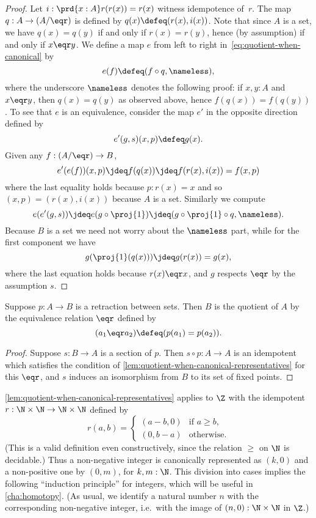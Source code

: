 \begin{proof}
  Let $i : \prd{x : A} r(r(x)) = r(x)$ witness idempotence of~$r$.
  The map $q : A \to (A/{\eqr})$ is defined by $q(x) \defeq (r(x), i(x))$.
  Note that since $A$ is a set, we have $q(x)=q(y)$ if and only if $r(x)=r(y)$, hence (by assumption) if and only if $x \eqr y$.
  We define a map $e$ from left to right in~\eqref{eq:quotient-when-canonical} by
  \[ e(f) \defeq (f \circ q, \nameless), \]
  where the underscore $\nameless$ denotes the following proof: if $x, y : A$ and $x \eqr y$, then $q(x)=q(y)$ as observed above, hence $f(q(x)) = f(q(y))$.
  To see that $e$ is an equivalence, consider the map $e'$ in the opposite direction defined by
  \[ e'(g, s) (x,p) \defeq g(x). \]
  Given any $f : (A/{\eqr}) \to B$,
  \[ e'(e(f))(x, p) \jdeq f(q(x)) \jdeq f(r(x), i(x)) = f(x, p) \]
  where the last equality holds because $p : r(x) = x$ and so $(x,p) = (r(x), i(x))$
  because $A$ is a set. Similarly we compute
  \[ e(e'(g, s)) \jdeq e(g \circ \proj{1}) \jdeq (g \circ \proj{1} \circ q, {\nameless}). \]
  Because $B$ is a set we need not worry about the $\nameless$ part, while for the first
  component we have
  \[ g(\proj{1}(q(x))) \jdeq g(r(x)) = g(x), \]
  where the last equation holds because $r(x) \eqr x$, and $g$ respects $\eqr$ by
  the assumption $s$.
\end{proof}

\begin{cor}\label{thm:retraction-quotient}
  Suppose $p:A\to B$ is a retraction between sets.
  Then $B$ is the quotient of $A$ by the equivalence relation $\eqr$ defined by
  \[ (a_1 \eqr a_2) \defeq (p(a_1) = p(a_2)). \]
\end{cor}
\begin{proof}
  Suppose $s:B\to A$ is a section of $p$.
  Then $s\circ p : A\to A$ is an idempotent which satisfies the condition of \cref{lem:quotient-when-canonical-representatives} for this $\eqr$, and $s$ induces an isomorphism from $B$ to its set of fixed points.
\end{proof}

\begin{rmk}\label{Z-quotient-by-canonical-representatives}
\cref{lem:quotient-when-canonical-representatives} applies to $\Z$ with the idempotent $r : \N \times \N \to \N \times \N$
defined by
%
\begin{equation*}
  r(a, b) =
  \begin{cases}
    (a - b, 0) & \text{if $a \geq b$,} \\
    (0, b - a) & \text{otherwise.}
  \end{cases}
\end{equation*}
%
(This is a valid definition even constructively, since the relation $\geq$ on $\N$ is decidable.)
Thus a non-negative integer is canonically represented as $(k, 0)$ and a non-positive one by $(0, m)$, for $k,m:\N$.
This division into cases implies the following ``induction principle'' for integers, which will be useful in \cref{cha:homotopy}.
%
(As usual, we identify a natural number $n$ with the corresponding non-negative integer, i.e.\ with the image of $(n,0):\N\times\N$ in $\Z$.)
\end{rmk}

